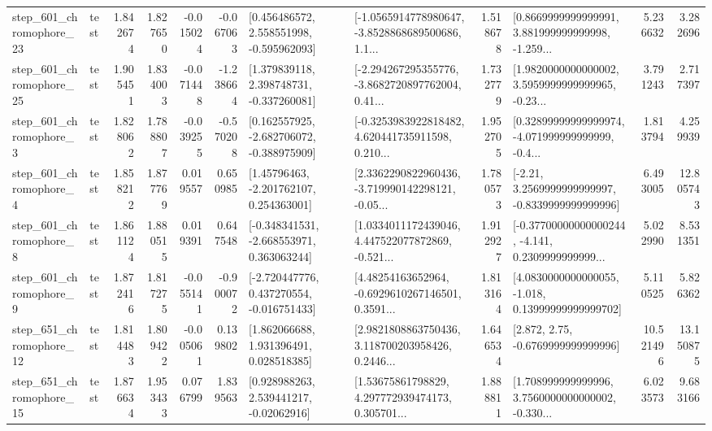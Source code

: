 \begin{tabular}{llrrrrllrlrr}
  step\_601\_chromophore\_23 &      test &      1.842674 &    1.827650 &     -0.015024 & -0.067063 &    [0.456486572, 2.558551998, -0.595962093] &  [-1.0565914778980647, -3.8528868689500686, 1.1... &       1.518678 &  [0.8669999999999991, 3.881999999999998, -1.259... &            5.236632 &          3.282696 \\
  step\_601\_chromophore\_25 &      test &      1.905451 &    1.834003 &     -0.071448 & -1.238664 &    [1.379839118, 2.398748731, -0.337260081] &  [-2.294267295355776, -3.8682720897762004, 0.41... &       1.732779 &  [1.9820000000000002, 3.5959999999999965, -0.23... &            3.791243 &          2.717397 \\
   step\_601\_chromophore\_3 &      test &      1.828062 &    1.788807 &     -0.039255 & -0.570208 &   [0.162557925, -2.682706072, -0.388975909] &  [-0.3253983922818482, 4.620441735911598, 0.210... &       1.952705 &  [0.32899999999999974, -4.071999999999999, -0.4... &            1.813794 &          4.259939 \\
   step\_601\_chromophore\_4 &      test &      1.858212 &    1.877769 &      0.019557 &  0.650985 &     [1.45796463, -2.201762107, 0.254363001] &  [2.3362290822960436, -3.719990142298121, -0.05... &       1.780573 &   [-2.21, 3.2569999999999997, -0.8339999999999996] &            6.493005 &         12.805743 \\
   step\_601\_chromophore\_8 &      test &      1.861124 &    1.880515 &      0.019391 &  0.647548 &   [-0.348341531, -2.668553971, 0.363063244] &  [1.0334011172439046, 4.447522077872869, -0.521... &       1.912927 &  [-0.37700000000000244, -4.141, 0.2309999999999... &            5.022990 &          8.531351 \\
   step\_601\_chromophore\_9 &      test &      1.872416 &    1.817275 &     -0.055141 & -0.900072 &   [-2.720447776, 0.437270554, -0.016751433] &  [4.48254163652964, -0.6929610267146501, 0.3591... &       1.813164 &  [4.0830000000000055, -1.018, 0.13999999999999702] &            5.110525 &          5.826362 \\
  step\_651\_chromophore\_12 &      test &      1.814483 &    1.809422 &     -0.005061 &  0.139802 &     [1.862066688, 1.931396491, 0.028518385] &  [2.9821808863750436, 3.118700203958426, 0.2446... &       1.646534 &                 [2.872, 2.75, -0.6769999999999996] &           10.521496 &         13.150875 \\
  step\_651\_chromophore\_15 &      test &      1.876634 &    1.953433 &      0.076799 &  1.839563 &     [0.928988263, 2.539441217, -0.02062916] &  [1.53675861798829, 4.297772939474173, 0.305701... &       1.888811 &  [1.708999999999996, 3.7560000000000002, -0.330... &            6.023573 &          9.683166 \\

\end{tabular}
